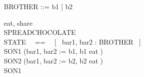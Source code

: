 \begin{zed}
BROTHER ::= b1 | b2
\end{zed}
\begin{circus}
\circchannel eat, share \\%
\circprocess SPREADCHOCOLATE \circdef \circbegin \\
    \circstate STATE ~~==~~ [~ bar1, bar2 : BROTHER ~] \\
    SON1 \circdef (bar1, bar2 := b1, b1 \circseq eat \then \Skip) \\
    SON2 \circdef (bar1, bar2 := b2, b2 \circseq eat \then \Skip) \\
    \circspot SON1 \\
\circend
\end{circus}
